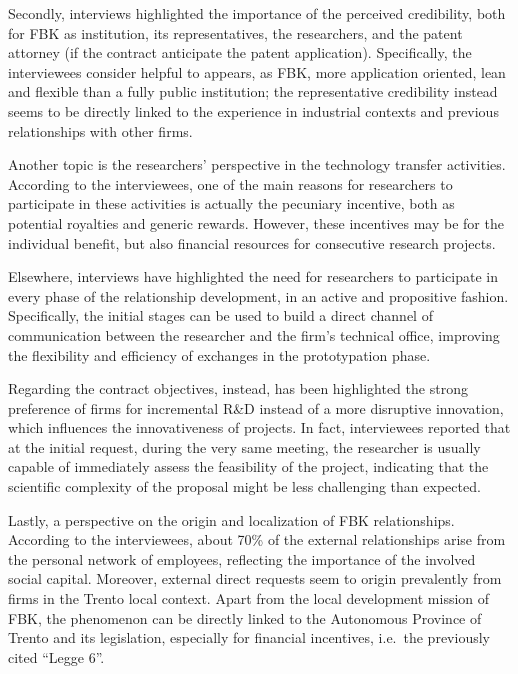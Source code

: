 Secondly, interviews highlighted the importance of the perceived credibility, both for FBK as institution, its representatives, the researchers, and the patent attorney (if the contract anticipate the patent application). Specifically, the interviewees consider helpful to appears, as FBK, more application oriented, lean and flexible than a fully public institution; the representative credibility instead seems to be directly linked to the experience in industrial contexts and previous relationships with other firms. 

Another topic is the researchers’ perspective in the technology transfer activities. According to the interviewees, one of the main reasons for researchers to participate in these activities is actually the pecuniary incentive, both as potential royalties and generic rewards. However, these incentives may be for the individual benefit, but also financial resources for consecutive research projects.  

Elsewhere, interviews have highlighted the need for researchers to participate in every phase of the relationship development, in an active and propositive fashion. Specifically, the initial stages can be used to build a direct channel of communication between the researcher and the firm's technical office, improving the flexibility and efficiency of exchanges in the prototypation phase.

Regarding the contract objectives, instead, has been highlighted the strong preference of firms for incremental R\&D instead of a more disruptive innovation, which influences the innovativeness of projects. In fact, interviewees reported that at the initial request, during the very same meeting, the researcher is usually capable of immediately assess the feasibility of the project, indicating that the scientific complexity of the proposal might be less challenging than expected.

Lastly, a perspective on the origin and localization of FBK relationships. According to the interviewees, about 70\% of the external relationships arise from the personal network of employees, reflecting the importance of the involved social capital. Moreover, external direct requests seem to origin prevalently from firms in the Trento local context. Apart from the local development mission of FBK, the phenomenon can be directly linked to the Autonomous Province of Trento and its legislation, especially for financial incentives, i.e.\ the previously cited \enquote{Legge 6}.


